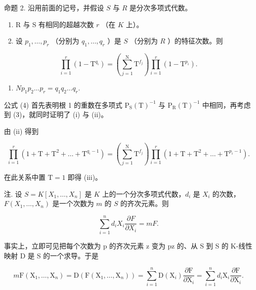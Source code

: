命题 2. 沿用前面的记号，并假设 \(S\) 与 \(R\) 是分次多项式代数。

\begin{enumerate}
\def\labelenumi{(\roman{enumi})}
\item
  R 与 S 有相同的超越次数 \(r\) （在 \(K\) 上）。
\item
  设 \(p_1, \ldots, p_r\) （分别为 \(q_1, \ldots, q_r\) ）是 \(S\) （分别为 \(R\) ）的特征次数。则
\end{enumerate}

\[
\prod_ {i = 1} ^ {r} \left(1 - \mathrm{T} ^ {q _ {i}}\right) = \left(\sum_ {j = 1} ^ {\mathrm{N}} \mathrm{T} ^ {f _ {j}}\right) \prod_ {i = 1} ^ {r} \left(1 - \mathrm{T} ^ {p _ {i}}\right).
\]

\begin{enumerate}
\def\labelenumi{(\roman{enumi})}
\setcounter{enumi}{2}
\tightlist
\item
  \(Np_{1}p_{2}\ldots p_{r}=q_{1}q_{2}\ldots q_{r}.\)
\end{enumerate}

公式 (4) 首先表明根 1 的重数在多项式 \(\mathrm{P}_{\mathrm{S}}(\mathrm{T})^{-1}\) 与 \(\mathrm{P}_{\mathrm{R}}(\mathrm{T})^{-1}\) 中相同，再考虑到 (3)，就同时证明了 (i) 与 (ii)。

由 (ii) 得到

\[
\prod_ {i = 1} ^ {r} \left(1 + \mathrm{T} + \mathrm{T} ^ {2} + \dots + \mathrm{T} ^ {q _ {i} - 1}\right) = \left(\sum_ {j = 1} ^ {\mathrm{N}} \mathrm{T} ^ {f _ {j}}\right) \prod_ {i = 1} ^ {r} \left(1 + \mathrm{T} + \mathrm{T} ^ {2} + \dots + \mathrm{T} ^ {p _ {i} - 1}\right).
\]

在此关系中置 \(\mathrm{T} = 1\) 即得 (iii)。

注. 设 \(S = K[X_1, \ldots, X_n]\) 是 \(K\) 上的一个分次多项式代数，\(d_i\) 是 \(X_i\) 的次数，\(F(X_1, \ldots, X_n)\) 是一个次数为 \(m\) 的 \(S\) 的齐次元素。则

\[
\sum_ {i = 1} ^ {n} d _ {i} X _ {i} \frac {\partial F}{\partial X _ {i}} = m F.\tag{5}
\]

事实上，立即可见把每个次数为 p 的齐次元素 z 变为 pz 的、从 S 到 S 的 K-线性映射 D 是 S 的一个求导。于是

\[
m \mathrm{F} (\mathrm{X} _ {1}, \dots , \mathrm{X} _ {n}) = \mathrm{D} (\mathrm{F} (\mathrm{X} _ {1}, \dots , \mathrm{X} _ {n})) = \sum_ {i = 1} ^ {n} \mathrm{D} (\mathrm{X} _ {i}) \frac {\partial \mathrm{F}}{\partial \mathrm{X} _ {i}} = \sum_ {i = 1} ^ {n} d _ {i} \mathrm{X} _ {i} \frac {\partial \mathrm{F}}{\partial \mathrm{X} _ {i}}.
\]

